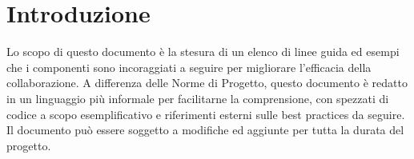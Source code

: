 \chapter{Introduzione}

Lo scopo di questo documento è la stesura di un elenco di linee guida ed esempi che i componenti sono incoraggiati a seguire per migliorare l'efficacia della collaborazione.
A differenza delle Norme di Progetto, questo documento \`{e} redatto in un linguaggio pi\`{u} informale per facilitarne la comprensione, con spezzati di codice a scopo esemplificativo e riferimenti esterni sulle best practices da seguire.\\
Il documento pu\`{o} essere soggetto a modifiche ed aggiunte per tutta la durata del progetto.
